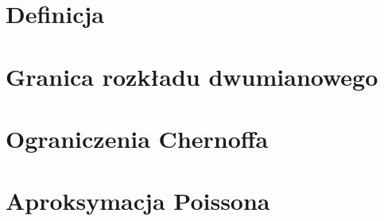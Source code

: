 \section{Definicja}


\newpage
\section{Granica rozkładu dwumianowego}


\newpage
\section{Ograniczenia Chernoffa}


\newpage
\section{Aproksymacja Poissona}


